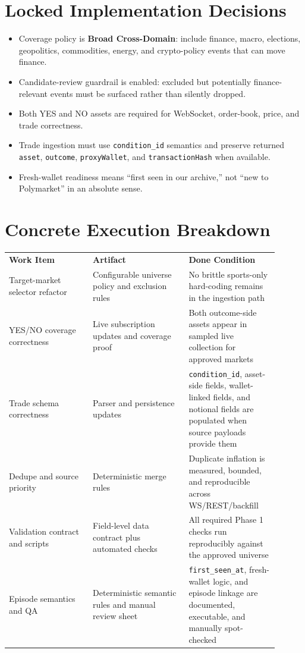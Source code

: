 \documentclass{article}
\begin{document}
\section*{Locked Implementation Decisions}
\begin{itemize}
\item Coverage policy is \textbf{Broad Cross-Domain}: include finance, macro, elections, geopolitics, commodities, energy, and crypto-policy events that can move finance.
\item Candidate-review guardrail is enabled: excluded but potentially finance-relevant events must be surfaced rather than silently dropped.
\item Both YES and NO assets are required for WebSocket, order-book, price, and trade correctness.
\item Trade ingestion must use \texttt{condition\_id} semantics and preserve returned \texttt{asset}, \texttt{outcome}, \texttt{proxyWallet}, and \texttt{transactionHash} when available.
\item Fresh-wallet readiness means ``first seen in our archive,'' not ``new to Polymarket'' in an absolute sense.
\end{itemize}

\section*{Concrete Execution Breakdown}
\begin{longtable}{p{0.28\linewidth}p{0.32\linewidth}p{0.30\linewidth}}
\textbf{Work Item} & \textbf{Artifact} & \textbf{Done Condition} \\
Target-market selector refactor & Configurable universe policy and exclusion rules & No brittle sports-only hard-coding remains in the ingestion path \\
YES/NO coverage correctness & Live subscription updates and coverage proof & Both outcome-side assets appear in sampled live collection for approved markets \\
Trade schema correctness & Parser and persistence updates & \texttt{condition\_id}, asset-side fields, wallet-linked fields, and notional fields are populated when source payloads provide them \\
Dedupe and source priority & Deterministic merge rules & Duplicate inflation is measured, bounded, and reproducible across WS/REST/backfill \\
Validation contract and scripts & Field-level data contract plus automated checks & All required Phase 1 checks run reproducibly against the approved universe \\
Episode semantics and QA & Deterministic semantic rules and manual review sheet & \texttt{first\_seen\_at}, fresh-wallet logic, and episode linkage are documented, executable, and manually spot-checked \\
\end{longtable}
\end{document}
